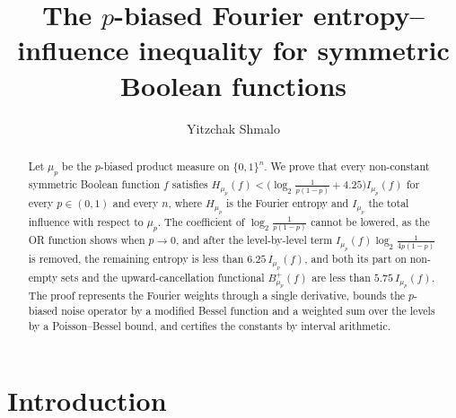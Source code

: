 \documentclass[11pt]{amsart}
\title{The $p$-biased Fourier entropy--influence inequality for symmetric Boolean functions}
\author{Yitzchak Shmalo}
\date{}
\theoremstyle{remark}
\begin{document}
\begin{abstract}
Let $\mu_p$ be the $p$-biased product measure on $\{0,1\}^n$. We prove that every non-constant symmetric Boolean function $f$ satisfies $H_{\mu_p}(f) < \bigl(\log_2\frac{1}{p(1-p)} + 4.25\bigr) I_{\mu_p}(f)$ for every $p \in (0,1)$ and every $n$, where $H_{\mu_p}$ is the Fourier entropy and $I_{\mu_p}$ the total influence with respect to $\mu_p$. The coefficient of $\log_2\frac{1}{p(1-p)}$ cannot be lowered, as the OR function shows when $p \to 0$, and after the level-by-level term $I_{\mu_p}(f)\log_2\frac{1}{4p(1-p)}$ is removed, the remaining entropy is less than $6.25\, I_{\mu_p}(f)$, and both its part on non-empty sets and the upward-cancellation functional $B^+_{\mu_p}(f)$ are less than $5.75\, I_{\mu_p}(f)$. The proof represents the Fourier weights through a single derivative, bounds the $p$-biased noise operator by a modified Bessel function and a weighted sum over the levels by a Poisson--Bessel bound, and certifies the constants by interval arithmetic.
\end{abstract}
\maketitle

\section{Introduction}
\end{document}
